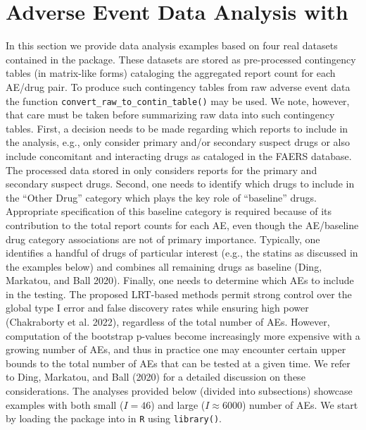 \hypertarget{adverse-event-data-analysis-with}{%
\section{\texorpdfstring{Adverse Event Data Analysis with }{Adverse Event Data Analysis with }}\label{adverse-event-data-analysis-with}}

In this section we provide data analysis examples based on four real datasets contained in the  package. These datasets are stored as pre-processed contingency tables (in matrix-like forms) cataloging the aggregated report count for each AE/drug pair. To produce such contingency tables from raw adverse event data the  function \texttt{convert\_raw\_to\_contin\_table()} may be used. We note, however, that care must be taken before summarizing raw data into such contingency tables. First, a decision needs to be made regarding which reports to include in the analysis, e.g., only consider primary and/or secondary suspect drugs or also include concomitant and interacting drugs as cataloged in the FAERS database. The processed data stored in  only considers reports for the primary and secondary suspect drugs. Second, one needs to identify which drugs to include in the ``Other Drug'' category which plays the key role of ``baseline'' drugs. Appropriate specification of this baseline category is required because of its contribution to the total report counts for each AE, even though the AE/baseline drug category associations are not of primary importance. Typically, one identifies a handful of drugs of particular interest (e.g., the statins as discussed in the examples below) and combines all remaining drugs as baseline (Ding, Markatou, and Ball 2020). Finally, one needs to determine which AEs to include in the testing. The proposed LRT-based methods permit strong control over the global type I error and false discovery rates while ensuring high power (Chakraborty et al. 2022), regardless of the total number of AEs. However, computation of the bootstrap p-values become increasingly more expensive with a growing number of AEs, and thus in practice one may encounter certain upper bounds to the total number of AEs that can be tested at a given time. We refer to Ding, Markatou, and Ball (2020) for a detailed discussion on these considerations. The analyses provided below (divided into subsections) showcase examples with both small (\(I = 46\)) and large (\(I \approx 6000\)) number of AEs. We start by loading the  package into in \texttt{R} using \texttt{library()}.

